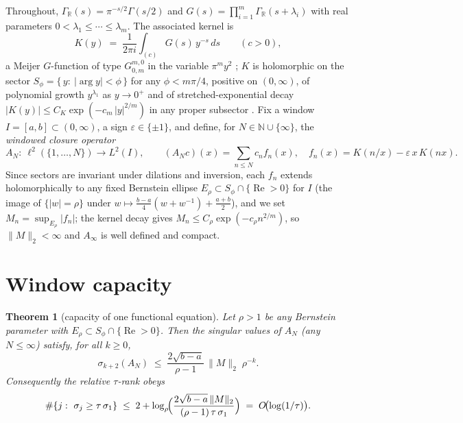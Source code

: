 \documentclass[11pt]{article}
\newtheorem{theorem}{Theorem}[section]
\theoremstyle{definition}
\theoremstyle{remark}
\newcommand{\R}{\mathbb{R}}
\newcommand{\N}{\mathbb{N}}
\renewcommand{\Re}{\operatorname{Re}}
\newcommand{\GR}{\Gamma_{\R}}
\begin{document}
Throughout, $\GR(s)=\pi^{-s/2}\Gamma(s/2)$ and
$G(s)=\prod_{i=1}^m \GR(s+\lambda_i)$ with real parameters
$0<\lambda_1\le\cdots\le\lambda_m$.  The associated kernel is
\[
K(y)\;=\;\frac{1}{2\pi i}\int_{(c)}G(s)\,y^{-s}\,ds\qquad(c>0),
\]
a Meijer $G$-function of type $G^{m,0}_{0,m}$ in the variable $\pi^m y^2$
\cite[Ch.~V]{Luke}; $K$ is holomorphic on the sector
$S_\phi=\{\,y:\ |\arg y|<\phi\,\}$ for any $\phi<m\pi/4$, positive on
$(0,\infty)$, of polynomial growth $y^{\lambda_1}$ as $y\to0^+$ and of
stretched-exponential decay
$|K(y)|\le C_K\exp(-c_m\,|y|^{2/m})$ in any proper subsector
\cite[Ch.~V, \S5.7--5.10]{Luke}.  Fix a window $I=[a,b]\subset(0,\infty)$, a
sign $\varepsilon\in\{\pm1\}$, and define, for $N\in\N\cup\{\infty\}$, the
\emph{windowed closure operator}
\[
A_N:\ \ell^2(\{1,\dots,N\})\longrightarrow L^2(I),\qquad
(A_Nc)(x)=\sum_{n\le N}c_n f_n(x),\quad
f_n(x)=K(n/x)-\varepsilon\,x\,K(nx).
\]
Since sectors are invariant under dilations and inversion, each $f_n$ extends
holomorphically to any fixed Bernstein ellipse
$E_\rho\subset S_\phi\cap\{\Re>0\}$ for $I$ (the image of $\{|w|=\rho\}$
under $w\mapsto\frac{b-a}{4}(w+w^{-1})+\frac{a+b}{2}$), and we set
$M_n=\sup_{E_\rho}|f_n|$; the kernel decay gives
$M_n\le C_\rho\exp(-c_\rho n^{2/m})$, so $\|M\|_2<\infty$ and $A_\infty$ is
well defined and compact.

\section{Window capacity}\label{sec:capacity}

\begin{theorem}[capacity of one functional equation]\label{thm:capacity}
Let $\rho>1$ be any Bernstein parameter with $E_\rho\subset
S_\phi\cap\{\Re>0\}$.  Then the singular values of $A_N$ (any $N\le\infty$)
satisfy, for all $k\ge0$,
\[
\sigma_{k+2}(A_N)\;\le\;\frac{2\sqrt{b-a}}{\rho-1}\,\|M\|_2\;\rho^{-k}.
\]
Consequently the relative $\tau$-rank obeys
\[
\#\{j:\ \sigma_j\ge\tau\,\sigma_1\}\;\le\;
2+\log_\rho\!\Bigl(\frac{2\sqrt{b-a}\,\|M\|_2}{(\rho-1)\,\tau\,\sigma_1}\Bigr)
\;=\;O\!\bigl(\log(1/\tau)\bigr).
\]
\end{theorem}
\end{document}
